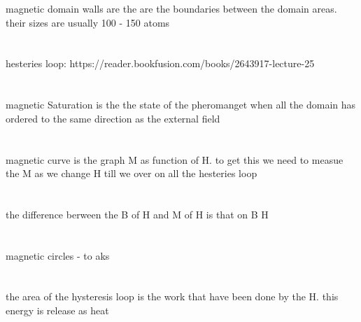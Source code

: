 \documentclass{article}
\begin{document}
magnetic domain walls are the are the boundaries between the domain areas.
their sizes are usually 100 - 150 atoms\

\section{}
hesteries loop: https://reader.bookfusion.com/books/2643917-lecture-25

\section{}
magnetic Saturation is the the state of the pheromanget when
all the domain has ordered to the same direction as the external field


\section{}
magnetic curve is the graph M as function of H. to get this
we need to measue the M as we change H till we over on all the hesteries loop

\section{}
the difference berween the B of H and M of H is that on B H

\section{}
magnetic circles - to aks

\section{}
the area of the hysteresis loop is the work that have been done by the
H. this energy is release as heat
\end{document}
